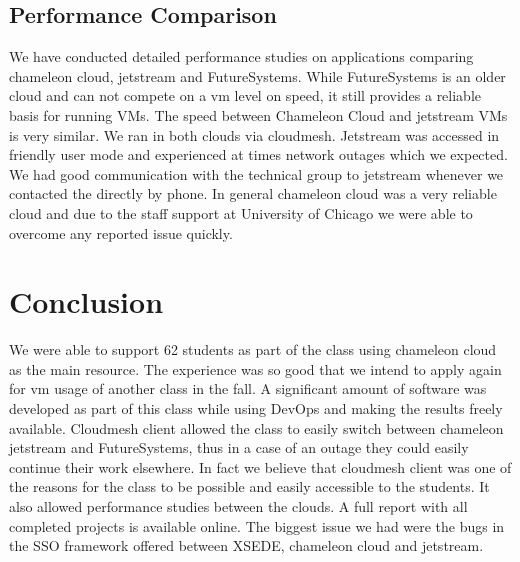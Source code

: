 \documentclass[sigconf]{acmart}
\begin{document}
\subsection{Performance Comparison}

We have conducted detailed performance studies on applications
comparing chameleon cloud, jetstream and FutureSystems. While
FutureSystems is an older cloud and can not compete on a vm level on
speed, it still provides a reliable basis for running VMs. The speed
between Chameleon Cloud and jetstream VMs is very similar. We ran in
both clouds via cloudmesh. Jetstream was accessed in friendly user
mode and experienced at times network outages which we expected. We
had good communication with the technical group to jetstream whenever
we contacted the directly by phone. In general chameleon cloud was a
very reliable cloud and due to the staff support at University of
Chicago we were able to overcome any reported issue quickly.

\section{Conclusion}

We were able to support 62 students as part of the class using
chameleon cloud as the main resource. The experience was so good that
we intend to apply again for vm usage of another class in the fall. A
significant amount of software was developed as part of this class
while using DevOps and making the results freely available. Cloudmesh
client allowed the class to easily switch between chameleon jetstream
and FutureSystems, thus in a case of an outage they could easily
continue their work elsewhere. In fact we believe that cloudmesh
client was one of the reasons for the class to be possible and easily
accessible to the students. It also allowed performance studies
between the clouds. A full report with all completed projects is
available online. The biggest issue we had were the bugs in the SSO
framework offered between XSEDE, chameleon cloud and jetstream.



 
\end{document}
